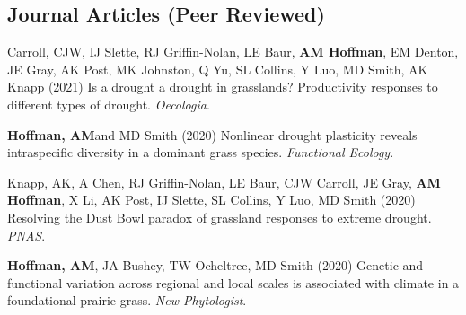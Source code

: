 \documentclass{cv}
\begin{document}
\subsection*{Journal Articles (Peer Reviewed)}

\begin{pubenum}





\item Carroll, CJW, IJ Slette, RJ Griffin-Nolan, LE Baur, \textbf{AM Hoffman}, EM Denton, JE Gray, AK Post, MK Johnston, Q Yu, SL Collins, Y Luo, MD Smith, AK Knapp (2021) Is a drought a drought in grasslands? Productivity responses to different types of drought. \textit{Oecologia}. 

\item\textbf{Hoffman, AM}\footnotemark[1] and MD Smith (2020) Nonlinear drought plasticity reveals intraspecific diversity in a dominant grass species. \textit{Functional Ecology}. \footnotemark[\value{footnote}]


\item Knapp, AK, A Chen, RJ Griffin-Nolan, LE Baur, CJW Carroll, JE Gray, \textbf{AM Hoffman}, X Li, AK Post, IJ Slette, SL Collins, Y Luo, MD Smith (2020) Resolving the Dust Bowl paradox of grassland responses to extreme drought. \textit{PNAS}. 

\item\textbf{Hoffman, AM}\footnotemark[1], JA Bushey, TW Ocheltree, MD Smith (2020) Genetic and functional variation across regional and local scales is associated with climate in a foundational prairie grass. \textit{New Phytologist}. 


\end{pubenum}
\end{document}
